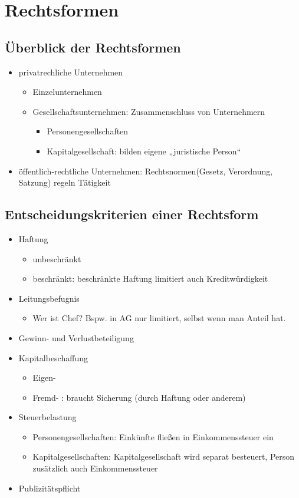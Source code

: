 \section{Rechtsformen}
\subsection{Überblick der Rechtsformen}
\begin{itemize}
\item privatrechliche Unternehmen
\begin{itemize}
\item Einzelunternehmen
\item Gesellschaftsunternehmen: Zusammenschluss von Unternehmern
\begin{itemize}
\item Personengesellschaften
\item Kapitalgesellschaft: bilden eigene „juristische Person“
\end{itemize}
\end{itemize}
\item öffentlich-rechtliche Unternehmen: Rechtsnormen(Gesetz, Verordnung, Satzung) regeln Tätigkeit
\end{itemize}
\subsection{Entscheidungskriterien einer Rechtsform}
\begin{itemize}
\item Haftung
\begin{itemize}
\item unbeschränkt
\item beschränkt: beschränkte Haftung limitiert auch Kreditwürdigkeit
\end{itemize}
\item Leitungsbefugnis
\begin{itemize}
\item Wer ist Chef? Bspw. in AG nur limitiert, selbst wenn man Anteil hat.
\end{itemize}
\item Gewinn- und Verlustbeteiligung
\item Kapitalbeschaffung
\begin{itemize}
\item Eigen-
\item Fremd- : braucht Sicherung (durch Haftung oder anderem)
\end{itemize}
\item Steuerbelastung
\begin{itemize}
\item Personengesellschaften: Einkünfte fließen in Einkommenssteuer ein
\item Kapitalgesellschaften: Kapitalgesellschaft wird separat besteuert, Person zusätzlich auch Einkommenssteuer
\end{itemize}
\item Publizitätspflicht
\end{itemize}
